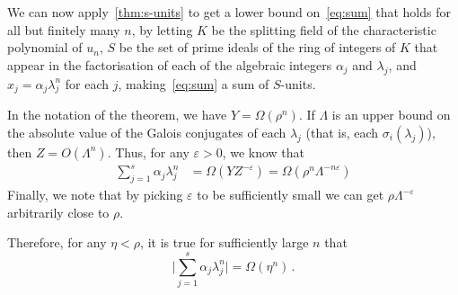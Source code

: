 We can now apply~\cref{thm:s-units} to get a lower bound on~\eqref{eq:sum} that holds for all but finitely many $n$, by letting $K$ be the splitting field of the characteristic polynomial of $u_n$, $S$ be the set of prime ideals of the ring of integers of $K$ that appear in the factorisation of each of the algebraic integers $\alpha_j$ and $\lambda_j$, and $x_j=\alpha_j\lambda_j^n$ for each $j$, making~\eqref{eq:sum} a sum of $S$-units.

In the notation of the theorem, we have $Y=\Omega(\rho^n)$. If $\Lambda$ is an upper bound on the absolute value of the Galois conjugates of each $\lambda_j$ (that is, each $\sigma_i(\lambda_j)$), then $Z=O(\Lambda^n)$. Thus, for any $\varepsilon>0$, we know that
\begin{align*}
\sum\limits_{j=1}^s\alpha_j\lambda_j^n &=\Omega(YZ^{-\varepsilon})=
\Omega\left(\rho^n\Lambda^{-n\varepsilon}\right)
\end{align*}
Finally, we note that by picking $\varepsilon$ to be sufficiently small we can get $\rho\Lambda^{-\varepsilon}$ arbitrarily close to $\rho$.

Therefore, for any $\eta < \rho$, it is true for sufficiently large $n$ that
\begin{equation*}
  \bigg\lvert \sum \limits_{j=1}^{s} \alpha_{j} \lambda_{j}^{n} \bigg\lvert = \Omega(\eta^{n}) \, .
\end{equation*}
